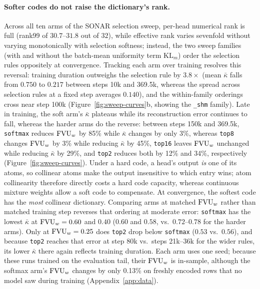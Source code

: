 \paragraph{Softer codes do not raise the dictionary's rank.} Across all ten arms
of the SONAR selection sweep, per-head numerical rank is full (rank99 of
$30.7$--$31.8$ out of $32$), while effective rank varies sevenfold without
varying monotonically with selection softness; instead, the two sweep
families (with and without the batch-mean uniformity term $\mathrm{KL}_m$)
order the selection rules oppositely at convergence. Tracking each arm over
training resolves this reversal: training duration outweighs the selection
rule by $3.8\times$ (mean $\bar\kappa$ falls from $0.750$ to $0.217$
between steps 10k and 369.5k, whereas the spread across selection rules at
a fixed step averages $0.140$), and the within-family orderings cross near
step 100k (Figure~\ref{fig:sweep-curves}b, showing the \texttt{\_shm}
family). Late in training, the soft arm's $\bar\kappa$ plateaus while its
reconstruction error continues to fall, whereas the harder arms do the
reverse: between steps 150k and 369.5k, \texttt{softmax} reduces $\mathrm{FVU}_w$ by
85\% while $\bar\kappa$ changes by only 3\%, whereas \texttt{top8} changes
$\mathrm{FVU}_w$ by 3\% while reducing $\bar\kappa$ by 45\%, \texttt{top16} leaves
$\mathrm{FVU}_w$ unchanged while reducing $\bar\kappa$ by 29\%, and \texttt{top2}
reduces both by 12\% and 34\%, respectively
(Figure~\ref{fig:sweep-curves}). Under a hard code, a head's output
\emph{is} one of its atoms, so collinear atoms make the output insensitive
to which entry wins; atom collinearity therefore directly costs a hard code
capacity, whereas continuous mixture weights allow a soft code to
compensate. At convergence, the softest code has the
\emph{most} collinear dictionary. Comparing arms at matched $\mathrm{FVU}_w$ rather
than matched training step reverses that ordering at moderate error:
\texttt{softmax} has the lowest $\bar\kappa$ at $\mathrm{FVU}_w = 0.60$ and $0.40$
($0.60$ and $0.58$, vs.\ $0.72$--$0.78$ for the harder arms). Only at
$\mathrm{FVU}_w = 0.25$ does \texttt{top2} drop below \texttt{softmax} ($0.53$ vs.\
$0.56$), and because \texttt{top2} reaches that error at step 80k vs.\
steps 21k--36k for the wider rules, its lower $\bar\kappa$ there again
reflects training duration. Each arm uses one seed; because these runs
trained on the evaluation tail, their $\mathrm{FVU}_w$ is in-sample, although the
softmax arm's $\mathrm{FVU}_w$ changes by only 0.13\% on freshly encoded rows that no
model saw during training (Appendix~\ref{app:data}).

